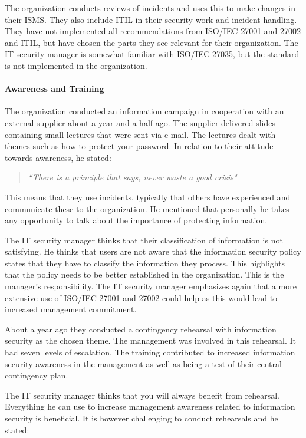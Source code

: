 The organization conducts reviews of incidents and uses this to make changes in their \ac{ISMS}. They also include \ac{ITIL} in their security work and incident handling. They have not implemented all recommendations from \acs{ISO}/\acs{IEC} 27001 and 27002 and \ac{ITIL}, but have chosen the parts they see relevant for their organization. The IT security manager is somewhat familiar with \acs{ISO}/\acs{IEC} 27035, but the standard is not implemented in the organization.

\paragraph{Awareness and Training}
The organization conducted an information campaign in cooperation with an external supplier about a year and a half ago. The supplier delivered slides containing small lectures that were sent via e-mail. The lectures dealt with themes such as how to protect your password. In relation to their attitude towards awareness, he stated: 

\begin{quote}
\textit{``There is a principle that says, never waste a good crisis"}
\end{quote}

This means that they use incidents, typically that others have experienced and communicate these to the organization. He mentioned that personally he takes any opportunity to talk about the importance of protecting information.

The IT security manager thinks that their classification of information is not satisfying. He thinks that users are not aware that the information security policy states that they have to classify the information they process. This highlights that the policy needs to be better established in the organization. This is the manager's responsibility. The IT security manager emphasizes again that a more extensive use of \acs{ISO}/\acs{IEC} 27001 and 27002 could help as this would lead to increased management commitment.

About a year ago they conducted a contingency rehearsal with information security as the chosen theme. The management was involved in this rehearsal. It had seven levels of escalation. The training contributed to increased information security awareness in the management as well as being a test of their central contingency plan.

The IT security manager thinks that you will always benefit from rehearsal. Everything he can use to increase management awareness related to information security is beneficial. It is however challenging to conduct rehearsals and he stated:

